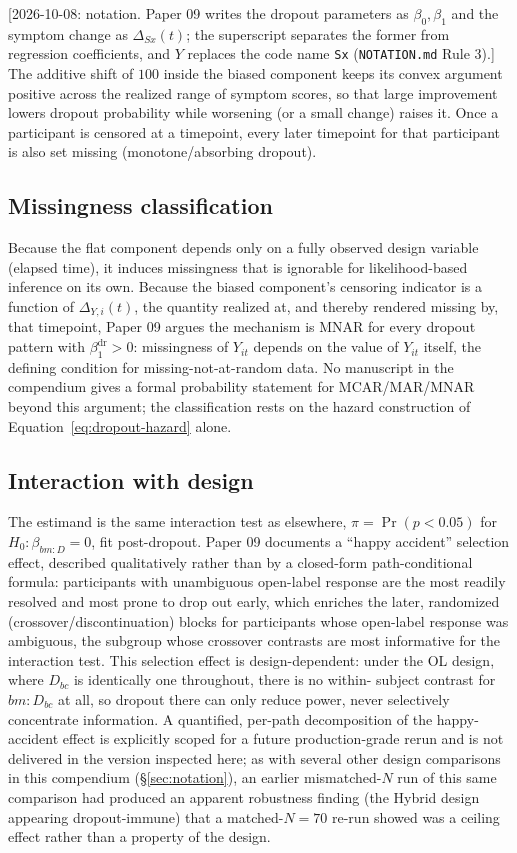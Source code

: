 \documentclass[11pt]{article}
\newcommand{\note}[1]{\textcolor{blue!60!black}{\small [#1]}}
\newcommand{\code}[1]{\texttt{#1}}
\begin{document}
\note{2026-10-08: notation. Paper 09 writes the dropout parameters as
$\beta_0, \beta_1$ and the symptom change as $\Delta_{Sx}(t)$; the
superscript separates the former from regression coefficients, and
$Y$ replaces the code name \code{Sx} (\code{NOTATION.md} Rule 3).} The additive shift of
$100$ inside the biased component keeps its convex argument positive
across the realized range of symptom scores, so that large
improvement lowers dropout probability while worsening (or a small
change) raises it. Once a participant is censored at a timepoint,
every later timepoint for that participant is also set missing
(monotone/absorbing dropout).

\subsection{Missingness classification}

Because the flat component depends only on a fully observed design
variable (elapsed time), it induces missingness that is ignorable for
likelihood-based inference on its own. Because the biased component's
censoring indicator is a function of $\Delta_{Y,i}(t)$, the quantity
realized at, and thereby rendered missing by, that timepoint, Paper 09
argues the mechanism is MNAR for every dropout pattern with
$\beta_1^{\mathrm{dr}} > 0$: missingness of $Y_{it}$ depends on the
value of $Y_{it}$ itself, the defining condition for
missing-not-at-random data. No manuscript in the compendium gives a formal
probability statement for MCAR/MAR/MNAR beyond this argument; the
classification rests on the hazard construction of
Equation~\eqref{eq:dropout-hazard} alone.

\subsection{Interaction with design}

The estimand is the same interaction test as elsewhere,
$\pi = \Pr(p<0.05)$ for $H_0: \beta_{bm:D}=0$, fit post-dropout. Paper
09 documents a ``happy accident'' selection effect, described
qualitatively rather than by a closed-form path-conditional formula:
participants with unambiguous open-label response are the most
readily resolved and most prone to drop out early, which enriches the
later, randomized (crossover/discontinuation) blocks for participants
whose open-label response was ambiguous, the subgroup whose crossover
contrasts are most informative for the interaction test. This selection effect is design-dependent: under the OL design,
where $D_{bc}$ is identically one throughout, there is no within-
subject contrast for $bm{:}D_{bc}$ at all, so dropout there can only
reduce power, never selectively concentrate information. A
quantified, per-path decomposition of the happy-accident effect is
explicitly scoped for a future production-grade rerun and is not
delivered in the version inspected here; as with several other design
comparisons in this compendium (\S\ref{sec:notation}), an earlier
mismatched-$N$ run of this same comparison had produced an apparent
robustness finding (the Hybrid design appearing dropout-immune) that a
matched-$N=70$ re-run showed was a ceiling effect rather than a
property of the design.
\end{document}
